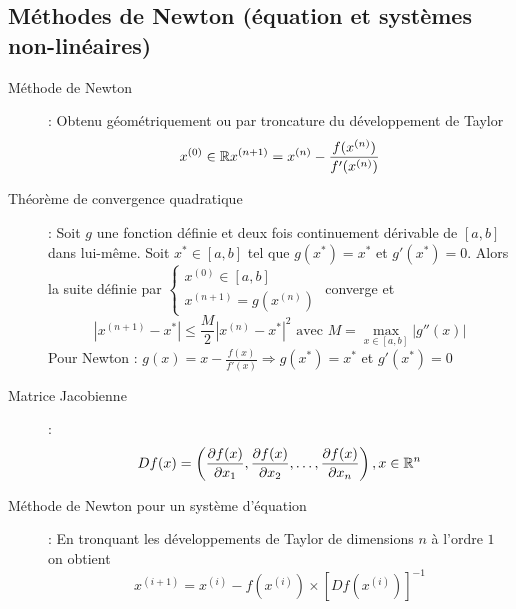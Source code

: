 \subsection{Méthodes de Newton (équation et systèmes non-linéaires)}
\begin{description}
\item[Méthode de Newton] : Obtenu géométriquement ou par troncature du développement de Taylor
    \[
        x^{(0)}\in\mathbb{R}\\
        x^{(n+1)}=x^{(n)}-\dfrac{f(x^{(n)})}{f'(x^{(n)})}
    \]
\item[Théorème de convergence quadratique] : Soit $g$ une fonction définie et deux fois continuement dérivable de $[a,b]$ dans lui-même. Soit $x^*\in[a,b]$ tel que
    $g(x^*)=x^*$ et $g'(x^*)=0$. Alors la suite définie par $\begin{cases}
        x^{(0)}\in [a,b]\\
        x^{(n+1)}=g(x^{(n)})
    \end{cases}$
    converge et
        \[
            |x^{(n+1)}-x^*|\le \frac{M}{2}|x^{(n)}-x^*|^2\textrm{ avec } M=\max_{x\in [a,b]}|g''(x)|
        \]
    Pour Newton : $g(x)=x-\frac{f(x)}{f'(x)}\Rightarrow g(x^*)=x^*$ et $g'(x^*)=0$
\item[Matrice Jacobienne] : 
    \[
        Df(x) = \left(
            \dfrac{\partial f(x)}{\partial x_1},
            \dfrac{\partial f(x)}{\partial x_2},
            \dots,
            \dfrac{\partial f(x)}{\partial x_n}
        \right), x\in\mathbb{R}^n
    \]
\item[Méthode de Newton pour un système d'équation] : En tronquant les développements de Taylor de dimensions $n$ à l'ordre $1$ on obtient
    \[
        x^{(i+1)}=x^{(i)}-f(x^{(i)})\times[Df(x^{(i)})]^{-1}
    \]
\end{description}
